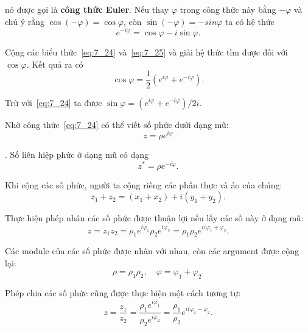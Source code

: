 \noindent
nó được gọi là \textbf{công thức Euler}. Nếu thay $\varphi$ trong công thức này bằng $-\varphi$ và chú ý rằng $\cos(-\varphi)=\cos\varphi$, còn $\sin(-\varphi)=-sin\varphi$ ta có hệ thức
\begin{equation}\label{eq:7_25}
	e^{-i\varphi} = \cos\varphi - i\sin\varphi.
\end{equation}

Cộng các biểu thức~\eqref{eq:7_24} và~\eqref{eq:7_25} và giải hệ thức tìm được đối với $\cos\varphi$. Kết quả ra có
\begin{equation}\label{eq:7_26}
	\cos\varphi = \frac{1}{2}\left(e^{i\varphi} + e^{-i\varphi}\right).
\end{equation}

\noindent
Trừ  với~\eqref{eq:7_24} ta được $\sin\varphi=\left(e^{i\varphi} + e^{-i\varphi}\right)/2i$.

Nhờ công thức~\eqref{eq:7_24} có thể viết số phức dưới dạng mũ:
\begin{equation}\label{eq:7_27}
	z = \rho e^{i\varphi}
\end{equation}

. Số liên hiệp phức ở dạng mũ có dạng
\begin{equation}\label{eq:7_28}
	z^* = \rho e^{-i\varphi}.
\end{equation}

\noindent
Khi cộng các số phức, người ta cộng riêng các phần thực và ảo của chúng:
\begin{equation}\label{eq:7_29}
	z_1 + z_2 = (x_1 + x_2) + i(y_1 + y_2).
\end{equation}

Thực hiện phép nhân các số phức được thuận lợi nếu lấy các số này ở dạng mũ:
\begin{equation}\label{eq:7_30}
	z = z_1 z_2 = \rho_1 e^{i\varphi_1} \rho_2 e^{i\varphi_2} = \rho_1\rho_2 e^{i(\varphi_1 + \varphi_2}.
\end{equation}

\noindent
Các module của các số phức được nhân với nhau, còn các argument được cộng lại:
\begin{equation}\label{eq:7_31}
	\rho = \rho_1\rho_2,\quad \varphi = \varphi_1 + \varphi_2.
\end{equation}

\noindent
Phép chia các số phức cũng được thực hiện một cách tương tự:
\begin{equation}\label{eq:7_32}
	z = \frac{z_1}{z_2} = \frac{\rho_1 e^{i\varphi_1}}{\rho_2 e^{i\varphi_2}} = \frac{\rho_1}{\rho_2}e^{i(\varphi_1 - \varphi_2}.
\end{equation}

